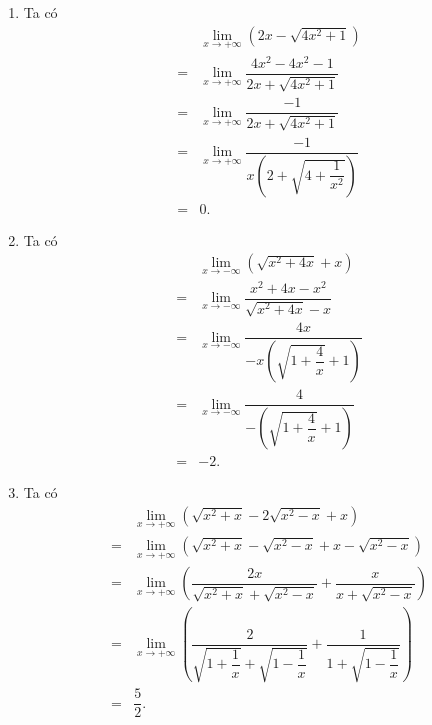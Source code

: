 \begin{ex}
{\begin{enumerate}
\begin{eqnarray*}
				&=& \displaystyle\lim_{x \to  +\infty} x\left(\sqrt{1-\dfrac{2}{x}} - \sqrt{2} \right) \\
				&=& -\infty. 
			\end{eqnarray*}
			Vì $\displaystyle\lim_{x  \to +\infty} \left(\sqrt{1-\dfrac{2}{x}}-\sqrt{2}\right)=1-\sqrt{2}<0$ và $\displaystyle\lim_{x \to +\infty} x=+\infty$.
			\item Ta  có
			\begin{eqnarray*}
				 &&\displaystyle\lim_{x \to +\infty} \left(2x-\sqrt{4x^2+1}\right) \\
				&=&\displaystyle\lim_{x  \to +\infty} \dfrac{4x^2-4x^2-1}{2x+\sqrt{4x^2+1}}\\
				&=&\displaystyle\lim_{x \to +\infty} \dfrac{-1}{2x+\sqrt{4x^2+1}}\\ 
				&=&\displaystyle\lim_{x \to +\infty}  \dfrac{-1}{x\left(2+\sqrt{4+\dfrac{1}{x^2}}\right)} \\
				&=&  0.
			\end{eqnarray*}
			\item  Ta có
			\begin{eqnarray*}
				&&\displaystyle\lim_{x\to -\infty} \left(\sqrt{x^2+4x}+x\right)\\ 
				&=&\displaystyle\lim_{x\to -\infty}  \dfrac{x^2+4x-x^2}{\sqrt{x^2+4x}-x}\\
				 &=&\displaystyle\lim_{x\to -\infty} \dfrac{4x}{-x\left( \sqrt{1+\dfrac{4}{x}}+1\right)}\\
				&=&\displaystyle\lim_{x\to  -\infty} \dfrac{4}{-\left( \sqrt{1+\dfrac{4}{x}}+1\right)}\\
				&=&-2. 
			\end{eqnarray*}
			 \item Ta có
			\begin{eqnarray*}
				&&\displaystyle\lim_{x \to +\infty}\left( \sqrt{x^2+x}-2\sqrt{x^2-x}+x\right)\\ 
				&=&\displaystyle\lim_{x \to +\infty}\left(  \sqrt{x^2+x}-\sqrt{x^2-x}+x-\sqrt{x^2-x}\right)\\
				 &=&\displaystyle\lim_{x \to +\infty}\left( \dfrac{2x}{\sqrt{x^2+x}+\sqrt{x^2-x}}+\dfrac{x}{x+\sqrt{x^2-x}}\right)\\
				 &=&\displaystyle\lim_{x \to +\infty}\left( \dfrac{2}{\sqrt{1+\dfrac{1}{x}}+\sqrt{1-\dfrac{1}{x}}}+\dfrac{1}{1+\sqrt{1-\dfrac{1}{x}}}\right)\\
				 &=&\dfrac{5}{2}.
			\end{eqnarray*}
		\end{enumerate}
	 }
\end{ex}

